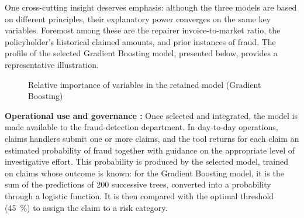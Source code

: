 One cross-cutting insight deserves emphasis: although the three models are based on different principles, their explanatory power converges on the same key variables. Foremost among these are the repairer invoice-to-market ratio, the policyholder's historical claimed amounts, and prior instances of fraud. The profile of the selected Gradient Boosting model, presented below, provides a representative illustration.

\begin{figure}[H]
    \centering
    \caption{Relative importance of variables in the retained model (Gradient Boosting)}
    \label{fig:importance-gb-en}
\end{figure}

\textbf{Operational use and governance :} Once selected and integrated, the model is made available to the fraud-detection department. In day-to-day operations, claims handlers submit one or more claims, and the tool returns for each claim an estimated probability of fraud together with guidance on the appropriate level of investigative effort. This probability is produced by the selected model, trained on claims whose outcome is known: for the Gradient Boosting model, it is the sum of the predictions of 200 successive trees, converted into a probability through a logistic function. It is then compared with the optimal threshold (45~\%) to assign the claim to a risk category.

